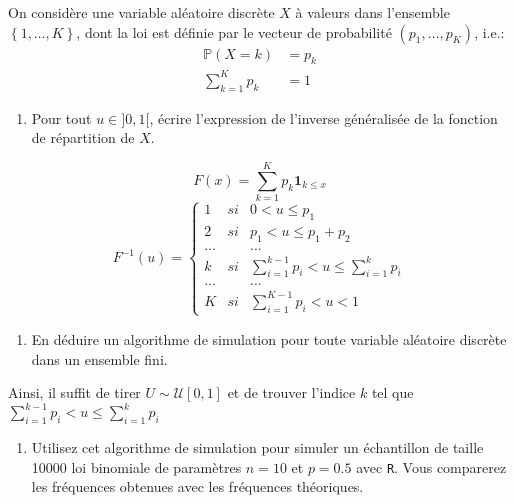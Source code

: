 \documentclass[
]{article}
\providecommand{\tightlist}{%
  \setlength{\itemsep}{0pt}\setlength{\parskip}{0pt}}
\newenvironment{Correction}%
  { \vspace{\baselineskip}\begin{mdframed}[backgroundcolor=my_green]}%
  {\end{mdframed}}
\begin{document}
\label{exo:inv:disc} On considère une variable aléatoire discrète \(X\)
à valeurs dans l'ensemble \(\left\lbrace 1,\dots, K\right\rbrace\), dont
la loi est définie par le vecteur de probabilité \((p_1, \dots, p_K)\),
i.e.: \begin{align}
\mathbb{P}(X = k) &= p_k\\
\sum_{k = 1}^K p_k &= 1
\end{align}

\begin{enumerate}
\def\labelenumi{\arabic{enumi}.}
\tightlist
\item
  Pour tout \(u \in ]0, 1[\), écrire l'expression de l'inverse
  généralisée de la fonction de répartition de \(X\).
\end{enumerate}

\begin{Correction}

$$F(x) = \sum_{k = 1}^{K}p_k\mathbf{1}_{k \leq x}$$
$$F^{-1}(u) = \left\lbrace
\begin{array}{lcr}
1 &si&0 < u \leq p_1\\
2 &si&p_1 < u \leq p_1 + p_2\\
\dots & & \dots\\
k &si &\sum_{i = 1}^{k - 1} p_i < u \leq \sum_{i = 1}^{k} p_i\\
\dots & & \dots\\
K&si& \sum_{i = 1}^{K - 1} p_i < u < 1
\end{array}
\right.$$

\end{Correction}

\begin{enumerate}
\def\labelenumi{\arabic{enumi}.}
\setcounter{enumi}{1}
\tightlist
\item
  En déduire un algorithme de simulation pour toute variable aléatoire
  discrète dans un ensemble fini.
\end{enumerate}

\begin{Correction}

Ainsi, il suffit de tirer $U\sim \mathcal{U}[0, 1]$ et de trouver l'indice $k$ tel que $\sum_{i = 1}^{k - 1} p_i < u \leq \sum_{i = 1}^{k} p_i$

\end{Correction}

\begin{enumerate}
\def\labelenumi{\arabic{enumi}.}
\setcounter{enumi}{2}
\tightlist
\item
  Utilisez cet algorithme de simulation pour simuler un échantillon de
  taille 10000 loi binomiale de paramètres \(n = 10\) et \(p = 0.5\)
  avec \texttt{R}. Vous comparerez les fréquences obtenues avec les
  fréquences théoriques.
\end{enumerate}
\end{document}
